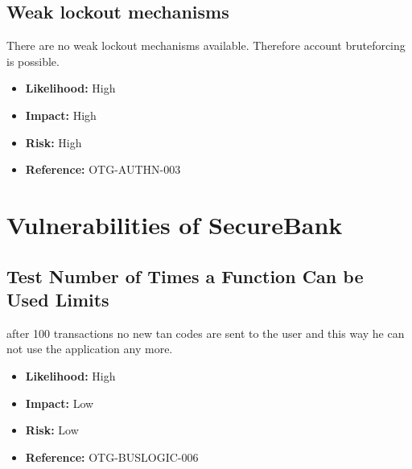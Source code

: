 \subsection{Weak lockout mechanisms}
There are no weak lockout mechanisms available. Therefore account bruteforcing is possible.
\begin{itemize}
	\item \textbf{Likelihood:} High
	\item \textbf{Impact:} High
	\item \textbf{Risk:} High
	\item \textbf{Reference:} OTG-AUTHN-003
\end{itemize}

\section{Vulnerabilities of SecureBank}

\subsection{Test Number of Times a Function Can be Used Limits}
after 100 transactions no new tan codes are sent to the user and this way he can not use the application any more.\\
\begin{itemize}
	\item \textbf{Likelihood:} High
	\item \textbf{Impact:} Low
	\item \textbf{Risk:} Low
	\item \textbf{Reference:} OTG-BUSLOGIC-006
\end{itemize}